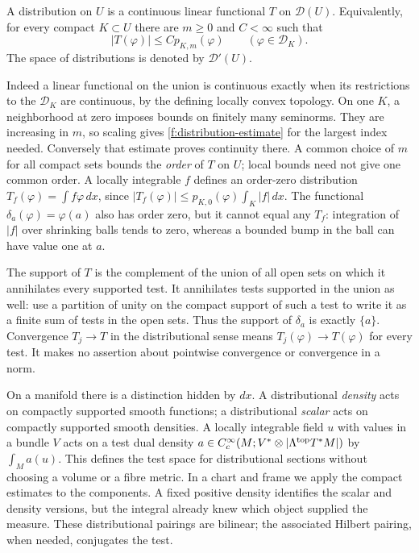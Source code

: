 \begin{definition}\label{f:order-bound}
A distribution on $U$ is a continuous linear functional $T$ on $\mathcal D(U)$. Equivalently, for every compact $K\subset U$ there are $m\geq0$ and $C<\infty$ such that
\begin{equation}
 |T(\varphi)|\leq C p_{K,m}(\varphi)\qquad (\varphi\in\mathcal D_K).\label{f:distribution-estimate}
\end{equation}
The space of distributions is denoted by $\mathcal D'(U)$.
\end{definition}
Indeed a linear functional on the union is continuous exactly when its restrictions to the $\mathcal D_K$ are continuous, by the defining locally convex topology. On one $K$, a neighborhood at zero imposes bounds on finitely many seminorms. They are increasing in $m$, so scaling gives \eqref{f:distribution-estimate} for the largest index needed. Conversely that estimate proves continuity there. A common choice of $m$ for all compact sets bounds the \emph{order} of $T$ on $U$; local bounds need not give one common order. A locally integrable $f$ defines an order-zero distribution $T_f(\varphi)=\int f\varphi\,dx$, since $|T_f(\varphi)|\leq p_{K,0}(\varphi)\int_K |f|\,dx$. The functional $\delta_a(\varphi)=\varphi(a)$ also has order zero, but it cannot equal any $T_f$: integration of $|f|$ over shrinking balls tends to zero, whereas a bounded bump in the ball can have value one at $a$.

The support of $T$ is the complement of the union of all open sets on which it annihilates every supported test. It annihilates tests supported in the union as well: use a partition of unity on the compact support of such a test to write it as a finite sum of tests in the open sets. Thus the support of $\delta_a$ is exactly $\{a\}$. Convergence $T_j\to T$ in the distributional sense means $T_j(\varphi)\to T(\varphi)$ for every test. It makes no assertion about pointwise convergence or convergence in a norm.

On a manifold there is a distinction hidden by $dx$. A distributional \emph{density} acts on compactly supported smooth functions; a distributional \emph{scalar} acts on compactly supported smooth densities. A locally integrable field $u$ with values in a bundle $V$ acts on a test dual density $a\in C_c^\infty(M;V^*\otimes |\Lambda^{\rm top}T^*M|)$ by $\int_M a(u)$. This defines the test space for distributional sections without choosing a volume or a fibre metric. In a chart and frame we apply the compact estimates to the components. A fixed positive density identifies the scalar and density versions, but the integral already knew which object supplied the measure. These distributional pairings are bilinear; the associated Hilbert pairing, when needed, conjugates the test.

